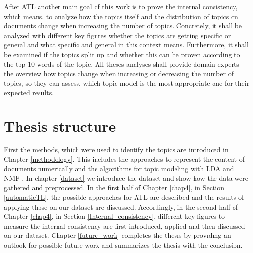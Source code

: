 After \ac{ATL} another main goal of this work is to prove the internal consistency, which means, to analyze how the topics itself and the distribution of topics on documents change when increasing the number of topics. Concretely, it shall be analyzed with different key figures whether the topics are getting specific or general and what specific and general in this context means. Furthermore, it shall be examined if the topics split up and whether this can be proven according to the top 10 words of the topic. All theses analyses shall provide domain experts the overview how topics change when increasing or decreasing the number of topics, so they can assess, which topic model is the most appropriate one for their expected results.
\section{Thesis structure}
First the methods, which were used to identify the topics are introduced in Chapter \ref{methodology}. This includes the approaches to represent the content of documents numerically and the algorithms for topic modeling with \acf{LDA} and \acf{NMF} .
In chapter \ref{dataset} we introduce the dataset and show how the data were gathered and preprocessed.
In the first half of Chapter \ref{chap4}, in Section \ref{automaticTL}, the possible approaches for \acl{ATL} are described and the results of applying those on our dataset are discussed. Accordingly, in the second half of Chapter \ref{chap4}, in Section \ref{Internal_consistency}, different key figures to measure the internal consistency are first introduced, applied and then discussed on our dataset.
Chapter \ref{future_work} completes the thesis by providing an outlook for possible future work and summarizes the thesis with the conclusion.

\newpage